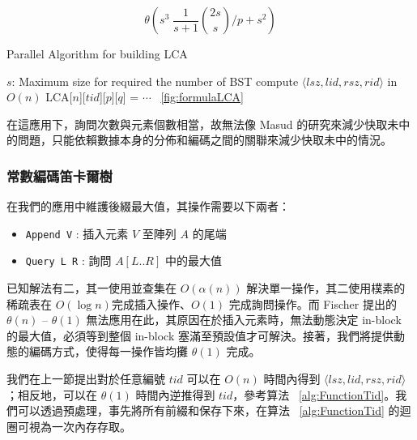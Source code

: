 \documentclass{gapd}
\begin{document}
$$\theta\left(s^3 \; \frac{1}{s+1} \binom{2s}{s} \bigg/ p + s^2 \right)$$

\begin{algorithm*}
  \caption{Parallel Algorithm for building LCA}
  \label{alg:parallelLCA}
  \begin{algorithmic}[1]
    \Require
      $s$: Maximum size for required the number of BST
          \State compute $\langle\mathit{lsz},\mathit{lid},\mathit{rsz},\mathit{rid}\rangle$ in $O(n)$
            \State LCA[$n$][$\mathit{tid}$][$p$][$q$] = $\cdots$ ~\ref{fig:formulaLCA}
          \EndFor
        \EndParFor
      \EndParFor
    \EndFor
  \end{algorithmic}
\end{algorithm*}

在這應用下，詢問次數與元素個數相當，故無法像 Masud \cite{masud} 的研究來減少快取未中的問題，只能依賴數據本身的分佈和編碼之間的關聯來減少快取未中的情況。

\subsubsection{常數編碼笛卡爾樹}

在我們的應用中維護後綴最大值，其操作需要以下兩者：

\begin{itemize}
  \item \texttt{Append V} : 插入元素 $V$ 至陣列 $A$ 的尾端
  \item \texttt{Query L R} : 詢問 $A[L .. R]$ 中的最大值
\end{itemize}

已知解法有二，其一使用並查集在 $O(\alpha(n))$ 解決單一操作，其二使用樸素的稀疏表在 $O(\log n)$完成插入操作、$O(1)$ 完成詢問操作。而 Fischer \cite{fischer} 提出的 $\theta(n)$ -- $\theta(1)$ 無法應用在此，其原因在於插入元素時，無法動態決定 in-block 的最大值，必須等到整個 in-block 塞滿至預設值才可解決。接著，我們將提供動態的編碼方式，使得每一操作皆均攤 $\theta(1)$ 完成。

我們在上一節提出對於任意編號 $\mathit{tid}$ 可以在 $O(n)$ 時間內得到 $\langle\mathit{lsz},\mathit{lid},\mathit{rsz},\mathit{rid}\rangle$；相反地，可以在 $\theta(1)$ 時間內逆推得到 $\mathit{tid}$，參考算法 ~\ref{alg:FunctionTid}。我們可以透過預處理，事先將所有前綴和保存下來，在算法 ~\ref{alg:FunctionTid} 的迴圈可視為一次內存存取。
\end{document}
